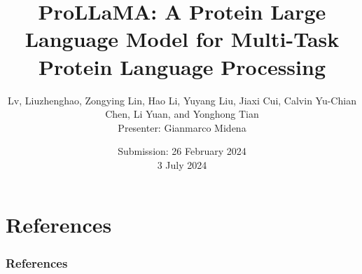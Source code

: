 \documentclass[dvipsnames]{beamer}
\title[ProLLaMA]
{ProLLaMA: A Protein Large Language Model for Multi-Task Protein Language Processing}
\author[Liuzhenghao Lv et al.]{Lv, Liuzhenghao, Zongying Lin, Hao Li, Yuyang Liu, Jiaxi Cui, Calvin Yu-Chian Chen, Li Yuan, and Yonghong Tian
\\\vspace{2em}Presenter: Gianmarco Midena}
\date[3 July 2024]{Submission: 26 February 2024 
\\\vspace{2em}3 July 2024}
\begin{document}
\begin{frame}
\titlepage
\end{frame}


\section{References}
\begin{frame}[allowframebreaks]
\frametitle{References}
\printbibliography
\end{frame}
\end{document}
